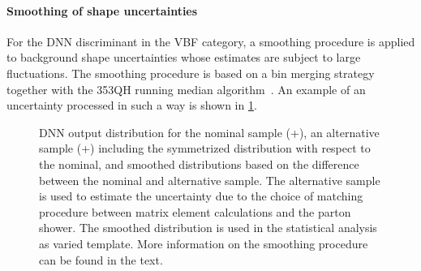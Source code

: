 \paragraph{Smoothing of shape uncertainties}
For the DNN discriminant in the VBF category, a smoothing procedure is applied to background shape uncertainties whose estimates are subject to large fluctuations. 
The smoothing procedure is based on a bin merging strategy together with the 353QH running median algorithm~\cite{Friedman353QH}. 
An example of an uncertainty processed in such a way is shown in \cref{fig:dnn:smoothing}.
\begin{figure}[th]
    \centering
    {\caption{DNN output distribution for the nominal \ttbar sample (\Powheg+\PYTHIAV), an alternative sample (\aMCATNLO+\PYTHIAV) including the symmetrized distribution with respect to the nominal, and smoothed distributions based on the difference between the nominal and alternative sample. The alternative sample is used to estimate the uncertainty due to the choice of matching procedure between matrix element calculations and the parton shower. The smoothed distribution is used in the statistical analysis as varied template. More information on the smoothing procedure can be found in the text.
    \label{fig:dnn:smoothing} }}
\end{figure}

